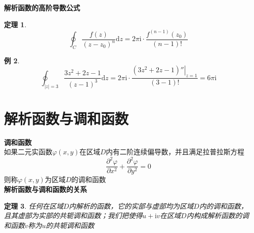 \documentclass[12pt, a4paper, twoside]{ctexbook}
\newtheorem{theorem}{定理}[section]
\newtheorem{example}[theorem]{例}
\begin{document}
\textbf{解析函数的高阶导数公式}
\begin{theorem}
	$$
	\oint_C{\frac{f\left( z \right)}{\left( z-z_0 \right) ^{n}}\mathrm{d}z}=2\pi \mathrm{i}\cdot \frac{f^{\left( n-1 \right)}\left( z_0 \right)}{\left(n-1\right)!}
	$$
\end{theorem}
\begin{example}
	$$
	\oint_{\left|z\right|=3}{\frac{3z^2+2z-1}{\left(z-1\right)^3}\mathrm{d}z}=2\pi\mathrm{i}\cdot \frac{\left.\left(3z^2+2z-1\right)''\right|_{z=1}}{\left(3-1\right)!}=6\pi\mathrm{i}
	$$
\end{example}
\section{解析函数与调和函数}
\textbf{调和函数}\\
如果二元实函数$\varphi \left( x,y \right)$在区域$D$内有二阶连续偏导数，并且满足拉普拉斯方程
$$
\frac{\partial ^2 \varphi}{\partial x^2}+\frac{\partial ^2 \varphi}{\partial y^2}=0
$$
则称$\varphi \left( x,y \right)$为区域$D$的调和函数\\

\textbf{解析函数与调和函数的关系}
\begin{theorem}
	任何在区域$D$内解析的函数，它的实部与虚部均为区域$D$内的调和函数，且其虚部为实部的共轭调和函数；我们把使得$u+\mathrm{i}v$在区域$D$内构成解析函数的调和函数$v$称为$u$的共轭调和函数
\end{theorem}
\end{document}
